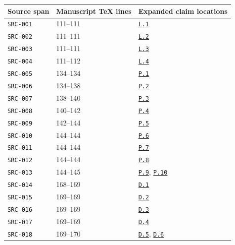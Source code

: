 \documentclass[12pt,letterpaper]{article}
\newcommand{\stepref}[1]{\hyperref[step:#1]{\texttt{#1}}}
\begin{document}
\begin{longtable}{p{.19\linewidth}p{.22\linewidth}p{.48\linewidth}}
\toprule Source span & Manuscript TeX lines & Expanded claim locations \\
\midrule\endhead

\texttt{SRC-001} & 111--111 & \stepref{L.1} \\

\texttt{SRC-002} & 111--111 & \stepref{L.2} \\

\texttt{SRC-003} & 111--111 & \stepref{L.3} \\

\texttt{SRC-004} & 111--112 & \stepref{L.4} \\

\texttt{SRC-005} & 134--134 & \stepref{P.1} \\

\texttt{SRC-006} & 134--138 & \stepref{P.2} \\

\texttt{SRC-007} & 138--140 & \stepref{P.3} \\

\texttt{SRC-008} & 140--142 & \stepref{P.4} \\

\texttt{SRC-009} & 142--144 & \stepref{P.5} \\

\texttt{SRC-010} & 144--144 & \stepref{P.6} \\

\texttt{SRC-011} & 144--144 & \stepref{P.7} \\

\texttt{SRC-012} & 144--144 & \stepref{P.8} \\

\texttt{SRC-013} & 144--145 & \stepref{P.9}, \stepref{P.10} \\

\texttt{SRC-014} & 168--169 & \stepref{D.1} \\

\texttt{SRC-015} & 169--169 & \stepref{D.2} \\

\texttt{SRC-016} & 169--169 & \stepref{D.3} \\

\texttt{SRC-017} & 169--169 & \stepref{D.4} \\

\texttt{SRC-018} & 169--170 & \stepref{D.5}, \stepref{D.6} \\


\end{longtable}
\end{document}
